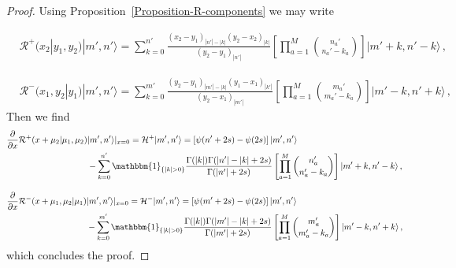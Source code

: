 \documentclass[11pt]{article}
\numberwithin{equation}{section}
\newcommand{\M}{M}
\newcommand{\eR}{\mathcal{R}}
\newcommand{\eH}{\mathcal{H}}
\begin{document}
\begin{proof}
 Using Proposition~\ref{Proposition-R-components} we may write




\begin{equation}\label{element-Mt}
		 				\begin{split}
		 					& \eR^+(x_2|y_1,y_2) |m',n'\rangle =  \sum_{k=0}^{n'}\frac{(x_2-y_1)_{|n'|-|k|} (y_2-x_2)_{|k|}}{(y_2-y_1)_{|n'|} }\left[\prod_{a=1}^{\M}\binom{n_a'}{n_a'-k_a}\right] |m'+k,n'-k\rangle\,,
		 				\end{split}
		 			\end{equation}

		 			\begin{equation}\label{element-Nt}
		 				\begin{split}
		 					& \eR^-(x_1,y_2|y_1) |m',n'\rangle =\sum_{k=0}^{m'} \frac{(y_2-y_1)_{|m'|-|k|} (y_1-x_1)_{|k'|}}{(y_2-x_1)_{|m'|} }\left[\prod_{a=1}^{\M}\binom{m_a'}{m_a'-k_a}\right] | m'-k,n'+k\rangle \,,
		 				\end{split}
		 			\end{equation}
Then we  find
\begin{equation}\label{element-Mr}
		 				\begin{split}
		 					\frac{\partial}{\partial x}  \eR^+(x+\mu_2|\mu_1,\mu_2)& |m',n'\rangle|_{x=0} =\eH^{+}|m',n'\rangle=\left[\psi(n'+2s)-\psi (2s)\right] |m',n'\rangle\\& -\sum_{k=0}^{n'}\mathbbm{1}_{\{|k|>0\}}\frac{\Gamma (|k|) \Gamma (|n'|-|k|+2s)}{\Gamma (|n'|+2s)}\left[\prod_{a=1}^{\M}\binom{n_a'}{n_a'-k_a}\right]  |m'+k,n'-k\rangle
		 					 \,,
		 				\end{split}
		 			\end{equation}

		 			\begin{equation}\label{element-Nr}
		 				\begin{split}
		 					\frac{\partial}{\partial x}  \eR^-(x+\mu_1,\mu_2|\mu_1) &|m',n'\rangle |_{x=0} =\eH^{-}|m',n'\rangle=\left[\psi(m'+2s)-\psi (2s)\right] |m',n'\rangle\\& -\sum_{k=0}^{m'}\mathbbm{1}_{\{|k|>0\}}\frac{\Gamma (|k|) \Gamma (|m'|-|k|+2s)}{\Gamma (|m'|+2s)}\left[\prod_{a=1}^{\M}\binom{m_a'}{m_a'-k_a}\right]  |m'-k,n'+k\rangle
		 					 \,,
		 				\end{split}
		 			\end{equation}
which concludes the proof.
                    
\end{proof}
\end{document}
